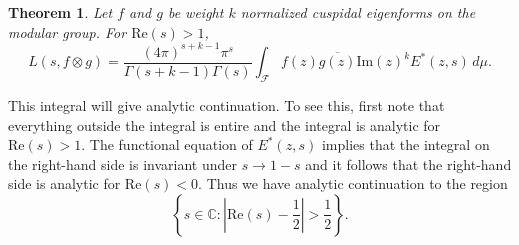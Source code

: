 \documentclass[12pt]{book}
\newtheorem{theorem}{Theorem}[section]
\theoremstyle{definition}\newframedtheorem{method}{Method}
\newcommand{\mc}{\mathcal}
\newcommand{\C}{\mathbb{C}}
\newcommand{\G}{\Gamma}
\newcommand{\ox}{\otimes}
\newcommand{\<}{\langle}
\renewcommand{\>}{\rangle}
\newcommand{\conj}{\overline}
\renewcommand{\Re}{\mathrm{Re}}
\renewcommand{\Im}{\mathrm{Im}}
\begin{document}
      \begin{theorem}
        Let $f$ and $g$ be weight $k$ normalized cuspidal eigenforms on the modular group. For $\Re(s) > 1$,
        \[
          L(s,f \ox g) = \frac{(4\pi)^{s+k-1}\pi^{s}}{\G(s+k-1)\G(s)}\int_{\mc{F}}f(z)\conj{g(z)}\Im(z)^{k}E^{\ast}(z,s)\,d\mu.
        \]
      \end{theorem}

      This integral will give analytic continuation. To see this, first note that everything outside the integral is entire and the integral is analytic for $\Re(s) > 1$. The functional equation of $E^{\ast}(z,s)$ implies that the integral on the right-hand side is invariant under $s \to 1-s$ and it follows that the right-hand side is analytic for $\Re(s) < 0$. Thus we have analytic continuation to the region
      \[
        \left\{s \in \C:\left|\Re(s)-\frac{1}{2}\right| > \frac{1}{2}\right\}.
      \]
\end{document}
